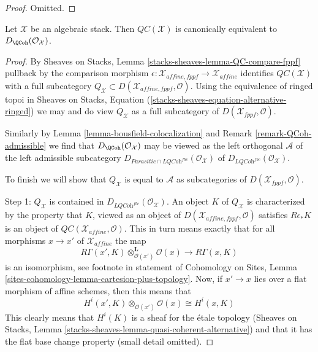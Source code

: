 \begin{proof}
Omitted.
\end{proof}

\begin{proposition}
\label{proposition-QC-compare}
Let $\mathcal{X}$ be an algebraic stack. Then $\mathit{QC}(\mathcal{X})$
is canonically equivalent to $D_\QCoh(\mathcal{O}_\mathcal{X})$.
\end{proposition}

\begin{proof}
By Sheaves on Stacks, Lemma \ref{stacks-sheaves-lemma-QC-compare-fppf}
pullback by the comparison morphism
$\epsilon : \mathcal{X}_{affine, fppf} \to \mathcal{X}_{affine}$
identifies $\mathit{QC}(\mathcal{X})$ with a full subcategory
$Q_\mathcal{X} \subset D(\mathcal{X}_{affine, fppf}, \mathcal{O})$.
Using the equivalence of ringed topoi in
Sheaves on Stacks, Equation (\ref{stacks-sheaves-equation-alternative-ringed})
we may and do view $Q_\mathcal{X}$ as a full subcategory of
$D(\mathcal{X}_{fppf}, \mathcal{O})$.

\medskip\noindent
Similarly by Lemma \ref{lemma-bousfield-colocalization} and
Remark \ref{remark-QCoh-admissible} we find that
$D_\QCoh(\mathcal{O}_\mathcal{X})$ may be viewed as the
left orthogonal $\mathcal{A}$ of the left admissible subcategory
$D_{\textit{Parasitic} \cap \textit{LQCoh}^{fbc}}(\mathcal{O}_\mathcal{X})$
of $D_{\textit{LQCoh}^{fbc}}(\mathcal{O}_\mathcal{X})$.

\medskip\noindent
To finish we will show that $Q_\mathcal{X}$ is equal to
$\mathcal{A}$ as subcategories of $D(\mathcal{X}_{fppf}, \mathcal{O})$.

\medskip\noindent
Step 1: $Q_\mathcal{X}$ is contained in
$D_{\textit{LQCoh}^{fbc}}(\mathcal{O}_\mathcal{X})$.
An object $K$ of $Q_\mathcal{X}$ is characterized by the property
that $K$, viewed as an object of $D(\mathcal{X}_{affine, fppf}, \mathcal{O})$
satisfies $R\epsilon_*K$ is an object of
$\mathit{QC}(\mathcal{X}_{affine}, \mathcal{O})$.
This in turn means exactly that for all morphisms $x \to x'$
of $\mathcal{X}_{affine}$ the map
$$
R\Gamma(x', K) \otimes_{\mathcal{O}(x')}^\mathbf{L} \mathcal{O}(x)
\longrightarrow
R\Gamma(x, K)
$$
is an isomorphism, see footnote in statement of Cohomology on Sites,
Lemma \ref{sites-cohomology-lemma-cartesion-plus-topology}.
Now, if $x' \to x$ lies over a flat morphism of affine schemes,
then this means that
$$
H^i(x', K) \otimes_{\mathcal{O}(x')} \mathcal{O}(x)
\cong
H^i(x, K)
$$
This clearly means that $H^i(K)$ is a sheaf for the \'etale topology
(Sheaves on Stacks, Lemma \ref{stacks-sheaves-lemma-quasi-coherent-alternative})
and that it has the flat base change property (small detail omitted).


\end{proof}
